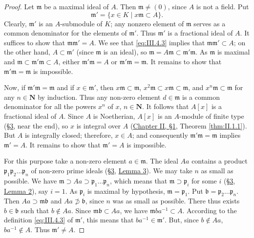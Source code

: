 \begin{proof}
Let $\mathfrak{m}$ be a maximal ideal of $A$. Then
$\mathfrak{m}\neq(0)$, since $A$ is not a field. Put
\begin{equation}
\mathfrak{m}'=\{x\in K\mid x\mathfrak{m}\subset A\}.
\label{eq:III.4.3}
\end{equation}
Clearly, $\mathfrak{m}'$ is an $A$-submodule of $K$; any nonzero element of
$\mathfrak{m}$ serves as a common denominator for the elements of
$\mathfrak{m}'$. Thus $\mathfrak{m}'$ is a fractional ideal of $A$. It
suffices to show that $\mathfrak{m}\mathfrak{m}'=A$. We see that
\eqref{eq:III.4.3} implies that $\mathfrak{m}\mathfrak{m}'\subset A$; on the
other hand, $A\subset\mathfrak{m}'$ (since $\mathfrak{m}$ is an ideal), so
$\mathfrak{m}=A\mathfrak{m}\subset\mathfrak{m}'\mathfrak{m}$. As
$\mathfrak{m}$ is maximal and
$\mathfrak{m}\subset\mathfrak{m}'\mathfrak{m}\subset A$, either
$\mathfrak{m}'\mathfrak{m}=A$ or $\mathfrak{m}'\mathfrak{m}=\mathfrak{m}$. It
remains to show that $\mathfrak{m}'\mathfrak{m}=\mathfrak{m}$ is impossible.

Now, if $\mathfrak{m}'\mathfrak{m}=\mathfrak{m}$ and if
$x\in\mathfrak{m}'$, then $x\mathfrak{m}\subset\mathfrak{m}$,
$x^{2}\mathfrak{m}\subset x\mathfrak{m}\subset\mathfrak{m}$, and
$x^{n}\mathfrak{m}\subset\mathfrak{m}$ for any $n\in\mathbf{N}$ by induction.
Thus any non-zero element $d\in\mathfrak{m}$ is a common denominator for all
the powers $x^{n}$ of $x$, $n\in\mathbf{N}$. It follows that $A[x]$ is a
fractional ideal of $A$. Since $A$ is Noetherian, $A[x]$ is an $A$-module of
finite type (\hyperref[sec:3.3]{§3}, near the end), so $x$ is integral over $A$ (\hyperref[sec:2.1]{Chapter II, §1},
Theorem \ref{thm:II.1.1}). But $A$ is integrally closed; therefore,
$x\in A$; and consequently $\mathfrak{m}'\mathfrak{m}=\mathfrak{m}$ implies
$\mathfrak{m}'=A$. It remains to show that $\mathfrak{m}'=A$ is impossible.

For this purpose take a non-zero element $a\in\mathfrak{m}$. The ideal $Aa$
contains a product $\mathfrak{p}_{1}\mathfrak{p}_{2}\ldots\mathfrak{p}_{n}$
of non-zero prime ideals (\hyperref[sec:3.3]{§3}, \hyperref[lem:III.3.3]{Lemma 3}). We may take $n$ as small as
possible. We have
$\mathfrak{m}\supset Aa\supset\mathfrak{p}_{1}\ldots\mathfrak{p}_{n}$, which
means that $\mathfrak{m}\supset\mathfrak{p}_{i}$ for some $i$ (\hyperref[sec:3.3]{§3}, \hyperref[lem:III.3.2]{Lemma 2}),
say $i=1$. As $\mathfrak{p}_{i}$ is maximal by hypothesis,
$\mathfrak{m}=\mathfrak{p}_{1}$. Put
$\mathfrak{b}=\mathfrak{p}_{2}\ldots\mathfrak{p}_{n}$. Then
$Aa\supset\mathfrak{m}\mathfrak{b}$ and $Aa\not\supset\mathfrak{b}$, since
$n$ was as small as possible. There thus exists $b\in\mathfrak{b}$ such that
$b\notin Aa$. Since $\mathfrak{m}\mathfrak{b}\subset Aa$, we have
$\mathfrak{m}ba^{-1}\subset A$. According to the definition
\eqref{eq:III.4.3} of $\mathfrak{m}'$, this means that
$ba^{-1}\in\mathfrak{m}'$. But, since $b\notin Aa$, $ba^{-1}\notin A$. Thus
$\mathfrak{m}'\neq A$.
\end{proof}

